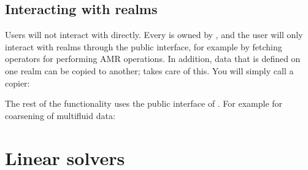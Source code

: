 \documentclass[letterpaper,10pt,english]{sphinxmanual}
\begin{document}
\subsection{Interacting with realms}
\label{\detokenize{Source/Realm:interacting-with-realms}}
\sphinxAtStartPar
Users will not interact with  directly.
Every  is owned by , and the user will only interact with realms through the public  interface, for example by fetching operators for performing AMR operations.
In addition, data that is defined on one realm can be copied to another;  takes care of this.
You will simply call a copier:

\begin{sphinxVerbatim}[commandchars=\\\{\},formatcom=\scriptsize]
 
 

\end{sphinxVerbatim}

\sphinxAtStartPar
The rest of the functionality uses the public interface of {\hyperref[\detokenize{Source/AmrMesh:chap-amrmesh}]{}}.
For example for coarsening of multifluid data:

\begin{sphinxVerbatim}[commandchars=\\\{\},formatcom=\scriptsize]
 
 
 

 
\end{sphinxVerbatim}

\sphinxstepscope


\section{Linear solvers}
\label{\detokenize{Source/LinearSolvers:linear-solvers}}\label{\detokenize{Source/LinearSolvers:chap-linearsolvers}}\label{\detokenize{Source/LinearSolvers::doc}}
\end{document}
